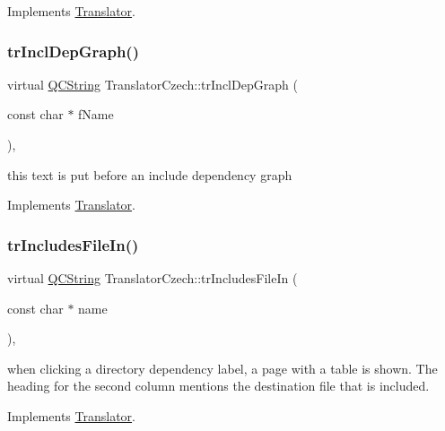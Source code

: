Implements \mbox{\hyperlink{class_translator}{Translator}}.

\mbox{\label{class_translator_czech_a877d173d0986d9cb4d94e81530aeb339}} 
\subsubsection{\texorpdfstring{trInclDepGraph()}{trInclDepGraph()}}
{\footnotesize\ttfamily virtual \mbox{\hyperlink{class_q_c_string}{Q\+C\+String}} Translator\+Czech\+::tr\+Incl\+Dep\+Graph (\begin{DoxyParamCaption}\item[{const char $\ast$}]{f\+Name }\end{DoxyParamCaption})\hspace{0.3cm}{\ttfamily [inline]}, {\ttfamily [virtual]}}

this text is put before an include dependency graph 

Implements \mbox{\hyperlink{class_translator}{Translator}}.

\mbox{\label{class_translator_czech_af25091b49c6cc81def3e115dfa919fde}} 
\subsubsection{\texorpdfstring{trIncludesFileIn()}{trIncludesFileIn()}}
{\footnotesize\ttfamily virtual \mbox{\hyperlink{class_q_c_string}{Q\+C\+String}} Translator\+Czech\+::tr\+Includes\+File\+In (\begin{DoxyParamCaption}\item[{const char $\ast$}]{name }\end{DoxyParamCaption})\hspace{0.3cm}{\ttfamily [inline]}, {\ttfamily [virtual]}}

when clicking a directory dependency label, a page with a table is shown. The heading for the second column mentions the destination file that is included. 

Implements \mbox{\hyperlink{class_translator}{Translator}}.

\mbox{\label{class_translator_czech_abfda849a688a320e08dfc5e6b51cd116}} 
